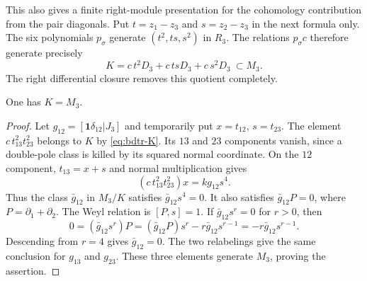This also gives a finite right-module presentation for the cohomology contribution from the pair diagonals.
Put $t=z_1-z_3$ and $s=z_2-z_3$ in the next formula only.
The six polynomials $p_\sigma$ generate $(t^2,ts,s^2)$ in $R_3$.
The relations $p_\sigma c$ therefore generate precisely
\begin{equation}\label{eq:bdtr-K}
 K=c\,t^2D_3+c\,tsD_3+c\,s^2D_3\ \subset M_3.
\end{equation}
The right differential closure removes this quotient completely.

\begin{lemma}\label{lem:bdtr-pair-surjection}
One has $K=M_3$.
\end{lemma}
\begin{proof}
Let $g_{12}=[\mathbf1\delta_{12}|J_3]$ and temporarily put $x=t_{12}$, $s=t_{23}$.
The element $c\,t_{13}^2t_{23}^2$ belongs to $K$ by \eqref{eq:bdtr-K}.
Its $13$ and $23$ components vanish, since a double-pole class is killed by its squared normal coordinate.
On the $12$ component, $t_{13}=x+s$ and normal multiplication gives
\[
 (c\,t_{13}^2t_{23}^2)x=k g_{12}s^4.
\]
Thus the class $\bar g_{12}$ in $M_3/K$ satisfies $\bar g_{12}s^4=0$.
It also satisfies $\bar g_{12}P=0$, where $P=\partial_1+\partial_2$.
The Weyl relation is $[P,s]=1$.
If $\bar g_{12}s^r=0$ for $r>0$, then
\[
 0=(\bar g_{12}s^r)P
   =(\bar g_{12}P)s^r-r\bar g_{12}s^{r-1}
   =-r\bar g_{12}s^{r-1}.
\]
Descending from $r=4$ gives $\bar g_{12}=0$.
The two relabelings give the same conclusion for $g_{13}$ and $g_{23}$.
These three elements generate $M_3$, proving the assertion.
\end{proof}

